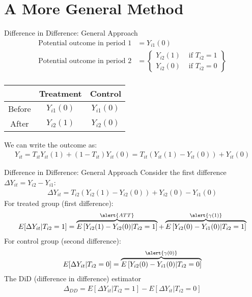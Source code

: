 \section{A More General Method}
\begin{frame}{Difference in Difference: General Approach}
\begin{align*}
\text{Potential outcome in period } 1&=Y_{i 1}(0)\\
\text{Potential outcome in period } 2&=\left\{ \begin{array}{ll}Y_{i 2}(1) & \text { if } T_{i 2}=1 \\ Y_{i 2}(0) & \text { if } T_{i 2}=0\end{array}\right\}\\
\end{align*}
\begin{center}
\begin{tabular}{|c|c|c|}
\hline & Treatment & Control \\
\hline Before & $Y_{i 1}(0)$ & $Y_{i 1}(0)$ \\
After & $Y_{i 2}(1)$ & $Y_{i 2}(0)$ \\
\hline
\end{tabular}
\end{center}
We can write the outcome as:
\begin{align*}
Y_{i t}=T_{i t} Y_{i t}(1)+\left(1-T_{i t}\right) Y_{i t}(0)=T_{i t}\left(Y_{i t}(1)-Y_{i t}(0) \right)+Y_{i t}(0)
\end{align*}
\end{frame}

\begin{frame}{Difference in Difference: General Approach}
\small
Consider the first difference $\Delta Y_{it} = Y_{i2} - Y_{i1}$:
\begin{align*}
\Delta Y_{it}  = T_{i2} \left(Y_{i2}(1) - Y_{i2}(0) \right) +  Y_{i2}(0) - Y_{i1}(0)
\end{align*}
For treated group (first difference):
\begin{align*}
E[\Delta Y_{it} | T_{i2}=1]  = \overbrace{E\left[Y_{i2}(1) - Y_{i2}(0) | T_{i2}=1 \right]}^{\alert{ATT}} +  \overbrace{E\left[Y_{i2}(0) - Y_{i1}(0) | T_{i2}=1 \right]}^{\alert{\gamma(1)}}
\end{align*}
For control group (second difference):
\begin{align*}
E[\Delta Y_{it} | T_{i2}=0]  = \overbrace{E\left[Y_{i2}(0) - Y_{i1}(0) | T_{i2}=0 \right]}^{\alert{\gamma(0)}}
\end{align*}
The DiD (difference in difference) estimator
\begin{align*}
\Delta_{DD} = E[\Delta Y_{it} | T_{i2}=1]  - E[\Delta Y_{it} | T_{i2}=0]  
\end{align*}
\end{frame}




